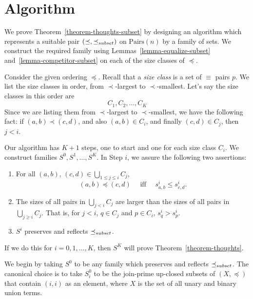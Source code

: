 \documentclass[12pt]{article}
\theoremstyle{definition}
\newcommand{\quadiff}{\quad \mbox{ iff } \quad}
\newcommand{\Pairs}{\mbox{Pairs}}
\newcommand{\precsubseteq}{\preceq_{\scriptsize subset}}
\begin{document}
\section{Algorithm}

We prove Theorem~\ref{theorem-thoughts-subset} by designing an algorithm
which represents a suitable pair $(\preceq,\precsubseteq)$ on $\Pairs(n)$ by a family
of sets.   We construct the required family using Lemmas~\ref{lemma-equalize-subset}
and~\ref{lemma-competitor-subset} on each of the 
size classes of $\preceq$.


Consider the given ordering $\preceq$.
Recall that a \emph{size class} is a set of $\equiv$
 pairs $p$.   We list the size classes in order, from $\prec$-largest to 
 $\prec$-smallest.   Let's say the size classes in this order are 
 \[  C_1, C_2, \ldots, C_K \]
 Since we are listing them from 
 $\prec$-largest to 
 $\prec$-smallest, we have the following fact:
 if $(a,b) \prec (c,d)$, and also  $(a,b)\in C_i$, and finally
 $(c,d)\in C_j$,
 then $j < i$.
 
 Our algorithm has $K+1$ steps, one to start
 and one for each size class $C_i$. 
 We construct families $S^0, S^1, \ldots, S^K$.
 In Step $i$,
 we assure the following two assertions:
 \begin{enumerate}
 \item For all $(a,b)$, $(c,d)\in \bigcup_{1\leq j\leq i} C_j$,
\begin{equation}
    \label{goal-in-alg}
 (a,b) \preceq  (c,d) \quadiff 
 s^i_{a,b}\leq s^i_{c,d}.
 \end{equation}
     \item 
The sizes of all pairs in $\bigcup_{j< i} C_j$ are larger than the sizes of all pairs in $\bigcup_{j\geq i} C_j$.
   That is, for  $j < i$, $q\in C_j$ and $p\in C_i$, $s^i_q > s^i_p$.
   \item $S^i$ preserves and reflects $\precsubseteq$.
 \end{enumerate}
 If we do this for $i = 0, 1, \ldots, K$, then $S^K$ will
 prove Theorem~\ref{theorem-thoughts}.
 
 We begin by taking $S^0$ to be any family
 which preserves and reflects $\precsubseteq$.
 The canonical choice is to take $S^0_i$ to be the join-prime up-closed
 subsets of $(X,\preceq)$ that contain $(i,i)$ as an element, where $X$ is the set of all unary and binary union terms.
 
\end{document}
